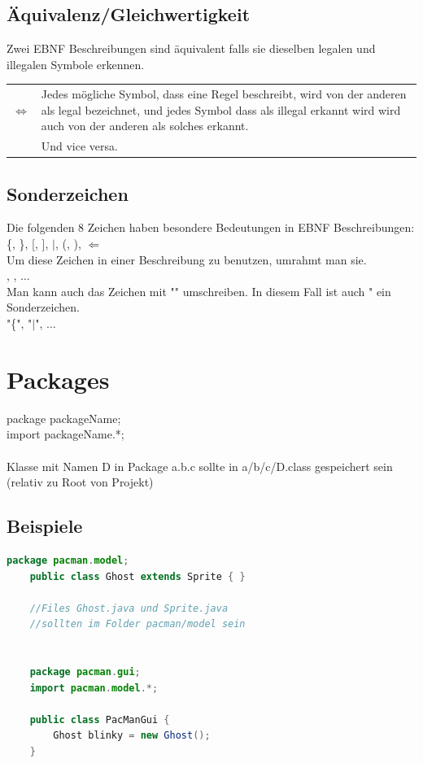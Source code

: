 \documentclass[12pt,a4paper]{article}
\begin{document}
\subsection{Äquivalenz/Gleichwertigkeit}
Zwei EBNF Beschreibungen sind äquivalent falls sie dieselben legalen und illegalen Symbole erkennen.\\
\begin{tabularx}{\linewidth}{l X}
$\iff$ & Jedes mögliche Symbol, dass eine Regel beschreibt, wird von der anderen als legal bezeichnet, und jedes Symbol dass als illegal erkannt wird wird auch von der anderen als solches erkannt.\\
& Und vice versa. %
\end{tabularx}
\subsection{Sonderzeichen}
Die folgenden 8 Zeichen haben besondere Bedeutungen in EBNF Beschreibungen:\\
\hspace*{1cm} \{, \}, [, ], $\mid$, (, ), $\Leftarrow$\\
Um diese Zeichen in einer Beschreibung zu benutzen, umrahmt man sie.\\
\hspace*{1cm} \fbox{\{}, \fbox{$\mid$}, $\hdots$\\
Man kann auch das Zeichen mit "" umschreiben. In diesem Fall ist auch " ein Sonderzeichen.\\ %
\hspace*{1cm} "\{", "$\mid$", $\hdots$
\newpage
\section{Packages}
package packageName;\\
import packageName.*;\\\\
Klasse mit Namen D in Package a.b.c sollte in a/b/c/D.class gespeichert sein (relativ zu Root von Projekt)
\subsection{Beispiele}
\begin{lstlisting}[language=Java]
	package pacman.model;
	public class Ghost extends Sprite { }

	//Files Ghost.java und Sprite.java
	//sollten im Folder pacman/model sein


	package pacman.gui;
	import pacman.model.*;

	public class PacManGui {
		Ghost blinky = new Ghost();
	}
\end{lstlisting}
\newpage
\end{document}
